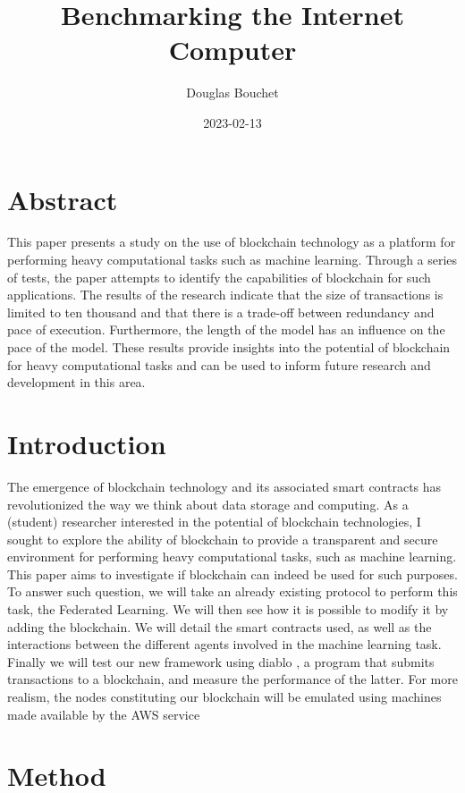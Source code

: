 \documentclass{article}
\title{Benchmarking the Internet Computer}
\date{2023-02-13}
\author{Douglas Bouchet}
\begin{document}
\maketitle
\newpage
{}

\tableofcontents

\newpage
\section{Abstract}
This paper presents a study on the use of blockchain technology as a platform for performing heavy computational tasks
such as machine learning. Through a series of tests, the paper attempts to identify the capabilities of blockchain for
such applications. The results of the research indicate that the size of transactions is limited to ten thousand
and that there is a trade-off between redundancy and pace of execution. Furthermore, the length of the model has an
influence on the pace of the model. These results provide insights into the potential of blockchain for heavy
computational tasks and can be used to inform future research and development in this area.
\newpage
\section{Introduction}
The emergence of blockchain technology and its associated smart contracts has revolutionized the way we think about data
storage and computing. As a (student) researcher interested in the potential of blockchain technologies, I sought to explore the
ability of blockchain to provide a transparent and secure environment for performing heavy computational tasks, such
as machine learning. This paper aims to investigate if blockchain can indeed be used for such purposes.
To answer such question, we will take an already existing protocol to perform this task, the Federated Learning. We will then see how it is possible to modify it by adding the blockchain.
We will detail the smart contracts used, as well as the interactions between the different agents involved in the
machine learning task. Finally we will test our new framework using diablo \cite{diablo}, a program that submits transactions
to a blockchain, and measure the performance of the latter. For more realism,
the nodes constituting our blockchain will be emulated using machines made available by the AWS service
\section{Method}
\end{document}
